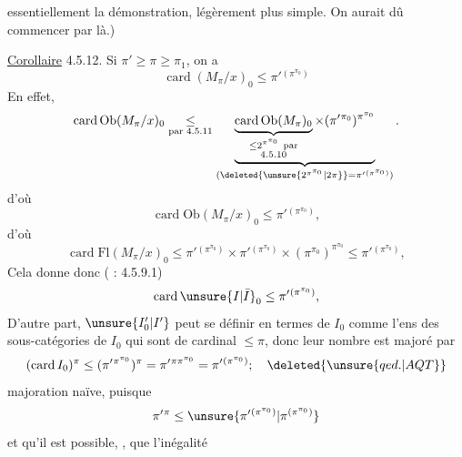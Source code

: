  essentiellement la  démonstration, légèrement plus simple. On aurait dû commencer par là.)

\uline{Corollaire} 4.5.12. Si $\pi'\geq\pi\geq\pi_1$, on a 
\[
\operatorname{card}(M_\pi/x)_0\leq\pi'{}^{(\pi^{\pi_0})}
\tag*{(4.5.12.1)}
\]
En effet,
\[
\operatorname{card}\mathrm{Ob}(M_\pi/x)_0
\underset{\text{par 4.5.11}}{\leq}
\underbrace{
\underbrace{\operatorname{card}\mathrm{Ob}(M_\pi)_0}_{\substack{\leq2^{\pi^{\pi_0}}\ \text{par}\\4.5.10}}
\times(\pi'{}^{\pi_0})^{\pi^{\pi_0}}
}_{(\deleted{\unsure{2^{\pi^{\pi_0}}|2\pi}}=\pi'{}^{(\pi^{\pi_0})})}.
\]
d'où
\[
\operatorname{card}\mathrm{Ob}(M_\pi/x)_0\leq\pi'{}^{(\pi^{\pi_0})},
\]
d'où
\[
\operatorname{card}\mathrm{Fl}(M_\pi/x)_0
\leq\pi'{}^{(\pi^{\pi_0})}\times\pi'{}^{(\pi^{\pi_0})}
\times(\pi^{\pi_0})^{\pi^{\pi_0}}
\leq\pi'{}^{(\pi^{\pi_0})},
\]
Cela donne donc ( : 4.5.9.1)
\[
\operatorname{card}\unsure{I|\bar I}_0\leq\pi'{}^{(\pi^{\pi_0})},
\]
 D'autre part, $\unsure{I'_0|I'}$ peut se définir en termes de $I_0$ comme l'ens des sous-catégories de $I_0$ qui sont  de cardinal $\leq\pi$, donc leur nombre est majoré par
\[
(\operatorname{card}I_0)^\pi
\leq(\pi'{}^{\pi^{\pi_0}})^\pi
=\pi'{}^{\pi\pi^{\pi_0}}
=\pi'{}^{(\pi^{\pi_0})};\quad\deleted{\unsure{qed.|AQT}}
\]
majoration naïve, puisque
\[
\pi'{}^\pi\leq\unsure{\pi'{}^{(\pi^{\pi_0})}|\pi^{(\pi^{\pi_0})}}
\]
et qu'il est possible, , que l'inégalité

